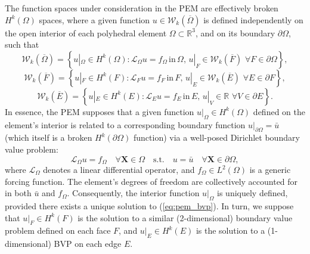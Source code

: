 	The function spaces under consideration in the PEM are effectively broken $H^k (\Omega)$ spaces, where a given function $u \in \mathcal{W}_k (\overline{\Omega})$ is defined independently on the open interior of each polyhedral element $\Omega \subset \mathbb{R}^3$, and on its boundary $\partial \Omega$, such that
	\begin{equation}
		\mathcal{W}_k (\overline{\Omega}) = \left\{ u|_{\Omega} \in H^k (\Omega) : \mathcal{L}_{\Omega} u = f_{\Omega} \, \text{in} \, \Omega, \, u|_{F} \in \mathcal{W}_k (\overline{F}) \, \, \forall F \in \partial \Omega \right\},
	\end{equation}
	\begin{equation}
		\mathcal{W}_k (\overline{F}) = \left\{ u|_{F} \in H^k (F) : \mathcal{L}_{F} u = f_{F} \, \text{in} \, F, \, u|_{E} \in \mathcal{W}_k (\overline{E}) \, \, \forall E \in \partial F \right\},
	\end{equation}
	\begin{equation}
		\mathcal{W}_k (\overline{E}) = \left\{ u|_{E} \in H^k (E) : \mathcal{L}_{E} u = f_{E} \, \text{in} \, E, \, u|_{V} \in \mathbb{R} \, \, \forall V \in \partial E \right\}.
	\end{equation}
	In essence, the PEM supposes that a given function $u|_{\Omega} \in H^k (\Omega)$ defined on the element's interior is related to a corresponding boundary function $u|_{\partial \Omega} = \bar{u}$ (which itself is a broken $H^k (\partial \Omega)$ function) via a well-posed Dirichlet boundary value problem:
	\begin{equation}
		\mathcal{L}_{\Omega} u = f_{\Omega} \quad \forall \mathbf{X} \in \Omega \quad \text{s.t.} \quad u = \bar{u} \quad \forall \mathbf{X} \in \partial \Omega,
		\label{eq:pem_bvp}
	\end{equation}
	where $\mathcal{L}_{\Omega}$ denotes a linear differential operator, and $f_{\Omega} \in L^2 (\Omega)$ is a generic forcing function. The element's degrees of freedom are collectively accounted for in both $\bar{u}$ and $f_{\Omega}$. Consequently, the interior function $u|_{\Omega}$ is uniquely defined, provided there exists a unique solution to (\ref{eq:pem_bvp}). In turn, we suppose that $u|_{F} \in H^k(F)$ is the solution to a similar (2-dimensional) boundary value problem defined on each face $F$, and $u|_E \in H^k(E)$ is the solution to a (1-dimensional) BVP on each edge $E$.
	
